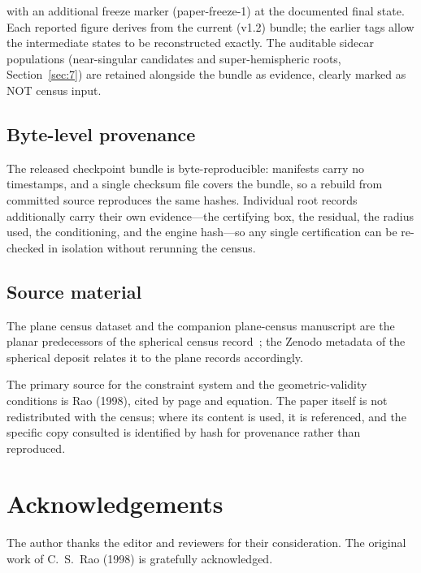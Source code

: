 \documentclass[pdflatex,sn-mathphys-num]{sn-jnl}
\begin{document}
with an additional freeze marker (paper-freeze-1) at the documented final state. Each reported figure derives from the current (v1.2) bundle; the earlier tags allow the intermediate states to be reconstructed exactly. The auditable sidecar populations (near-singular candidates and super-hemispheric roots, Section~\ref{sec:7}) are retained alongside the bundle as evidence, clearly marked as
NOT census input.

\subsection{Byte-level provenance}\label{sec:9.5}

The released checkpoint bundle is byte-reproducible: manifests carry no timestamps, and a single checksum file covers the bundle, so a rebuild from committed source reproduces the same hashes. Individual root records additionally carry their own evidence---the certifying box, the residual, the radius used, the conditioning, and the engine hash---so any single certification can be re-checked in isolation without rerunning the census.

\subsection{Source material}\label{sec:9.6}

The plane census dataset and the companion plane-census manuscript are the planar predecessors of the spherical census record~\cite{planedataset,planepaper}; the Zenodo metadata of the spherical deposit relates it to the plane records accordingly.

The primary source for the constraint system and the geometric-validity conditions is Rao (1998), cited by page and equation. The paper itself is not redistributed with the census; where its content is used, it is referenced, and the specific copy consulted is identified by hash for provenance rather than reproduced.

\backmatter

\section*{Acknowledgements}
The author thanks the editor and reviewers for their consideration. The original work of C.~S.~Rao (1998) is gratefully acknowledged.
\end{document}
